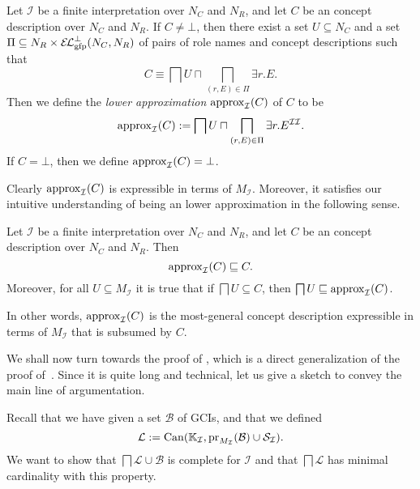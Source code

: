 \begin{Definition}
  \label{def:lower-approximation}
  Let $\mathcal{I}$ be a finite interpretation over $N_C$ and $N_R$, and let $C$ be an
  \ELgfpbot concept description over $N_C$ and $N_R$.  If $C \neq \bot$, then there exist
  a set $U \subseteq N_C$ and a set $\Pi \subseteq N_R \times {\ensuremath{{\mathcal{E}\kern-.3ex\mathcal{L}}_\text{gfp}^\bot}}(N_C, N_R)$ of
  pairs of role names and concept descriptions such that
  \begin{equation*}
    C \equiv \bigsqcap U \sqcap \bigsqcap_{(r, E) \in \Pi} \exists r. E.
  \end{equation*}
  Then we define the \emph{lower approximation} $\operatorname{approx}_{\mathcal{I}}(C)$ of $C$ to be
  \begin{equation*}
    \operatorname{approx}_{\mathcal{I}}(C) := \bigsqcap U \sqcap \bigsqcap_{(r, E) \in \Pi} \exists
    r. E^{\mathcal{I}\mathcal{I}}.
  \end{equation*}
  If $C = \bot$, then we define $\operatorname{approx}_{\mathcal{I}}(C) = \bot$.
\end{Definition}

Clearly $\operatorname{approx}_{\mathcal{I}}(C)$ is expressible in terms of $M_{\mathcal{I}}$.
Moreover, it satisfies our intuitive understanding of being an lower approximation in the
following sense.

\begin{Lemma}
  \label{lem:lapprox-is-lower-approximation}
  Let $\mathcal{I}$ be a finite interpretation over $N_C$ and $N_R$, and let $C$ be an
  \ELgfpbot concept description over $N_C$ and $N_R$.  Then
  \begin{equation*}
    \operatorname{approx}_{\mathcal{I}}(C) \sqsubseteq C.
  \end{equation*}
  Moreover, for all $U \subseteq M_{\mathcal{I}}$ it is true that if $\bigsqcap U
  \subseteq C$, then $\bigsqcap U \sqsubseteq \operatorname{approx}_{\mathcal{I}}(C)$.
\end{Lemma}

In other words, $\operatorname{approx}_{\mathcal{I}}(C)$ is the most-general concept description
expressible in terms of $M_{\mathcal{I}}$ that is subsumed by $C$.

We shall now turn towards the proof of , which is a direct
generalization of the proof of~\cite[Theorem~5.18]{Diss-Felix}.  Since it is quite long
and technical, let us give a sketch to convey the main line of argumentation.

Recall that we have given a set $\mathcal{B}$ of GCIs, and that we defined
\begin{equation*}
  \mathcal{L} := \operatorname{Can}({\mathbb{K}}_{\mathcal{I}}, \operatorname{pr}_{M_{\mathcal{I}}}(\mathcal{B}) \cup
  \mathcal{S}_{\mathcal{I}}).
\end{equation*}
We want to show that $\bigsqcap \mathcal{L} \cup \mathcal{B}$ is complete for
$\mathcal{I}$ and that $\bigsqcap \mathcal{L}$ has minimal cardinality with this property.

